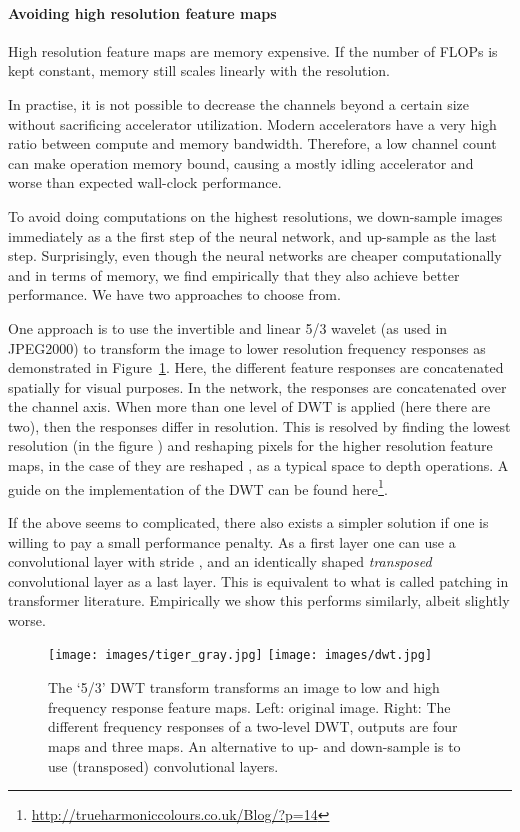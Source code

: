 \documentclass[nohyperref]{article}
\theoremstyle{plain}
\theoremstyle{definition}
\theoremstyle{remark}
\begin{document}
\paragraph{Avoiding high resolution feature maps}
High resolution feature maps are memory expensive. If the number of FLOPs is kept constant, memory still scales linearly with the resolution.

In practise, it is not possible to decrease the channels beyond a certain size without sacrificing accelerator utilization. Modern accelerators have a very high ratio between compute and memory bandwidth. Therefore, a low channel count can make operation memory bound, causing a mostly idling accelerator and worse than expected wall-clock performance.

To avoid doing computations on the highest resolutions, we down-sample images immediately as a the first step of the neural network, and up-sample as the last step. Surprisingly, even though the neural networks are cheaper computationally and in terms of memory, we find empirically that they also achieve better performance. We have two approaches to choose from.

One approach is to use the invertible and linear 5/3 wavelet (as used in JPEG2000) to transform the image to lower resolution frequency responses as demonstrated in Figure~\ref{fig:dwt}. Here, the different feature responses are concatenated spatially for visual purposes. In the network, the responses are concatenated over the channel axis. When more than one level of DWT is applied (here there are two), then the responses differ in resolution. This is resolved by finding the lowest resolution (in the figure ) and reshaping pixels for the higher resolution feature maps, in the case of  they are reshaped , as a typical space to depth operations. A guide on the implementation of the DWT can be found here\footnote{\url{http://trueharmoniccolours.co.uk/Blog/?p=14}}.

If the above seems to complicated, there also exists a simpler solution if one is willing to pay a small performance penalty. As a first layer one can use a  convolutional layer with stride , and an identically shaped \textit{transposed} convolutional layer as a last layer. This is equivalent to what is called patching in transformer literature. Empirically we show this performs similarly, albeit slightly worse.


\begin{figure}
    \centering
    \texttt{[image: images/tiger\_gray.jpg]}\hfill
    \texttt{[image: images/dwt.jpg]}
    \caption{The `5/3' DWT transform transforms an image to low and high frequency response feature maps. Left: original image. Right: The different frequency responses of a two-level DWT, outputs are four  maps and three  maps. An alternative to up- and down-sample is to use (transposed) convolutional layers.}
    \label{fig:dwt}
\end{figure}
\end{document}
